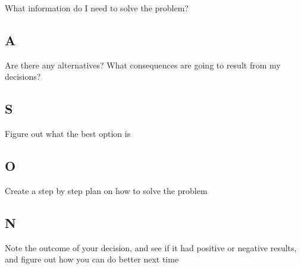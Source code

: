 \documentclass[11pt]{article}
\begin{document}
What information do I need to solve the problem?

\subsection*{A}
\label{sec:org038ab59}

Are there any alternatives? What consequences are going to result from my decisions?

\subsection*{S}
\label{sec:org823f05d}

Figure out what the best option is

\subsection*{O}
\label{sec:org7f58367}

Create a step by step plan on how to solve the problem

\subsection*{N}
\label{sec:org4272536}

Note the outcome of your decision, and see if it had positive or negative results, and figure out how you can do better next time
\end{document}
